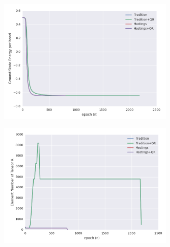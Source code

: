 \begin{figure}[ht]
	\centering
	\includegraphics[width=0.75\textwidth]{figures/fig326.png}
	\caption[CPU times of different 2D-iTEBD with dynamic trucation error]{}
	\label{fig326}
\end{figure}

\begin{figure}[ht]
	\centering
	\includegraphics[width=0.75\textwidth]{figures/fig327.png}
	\caption[Per epoch energy of Heisenberg model on 2d square lattice with dynamic truncation error]{}
	\label{fig327}
\end{figure}
